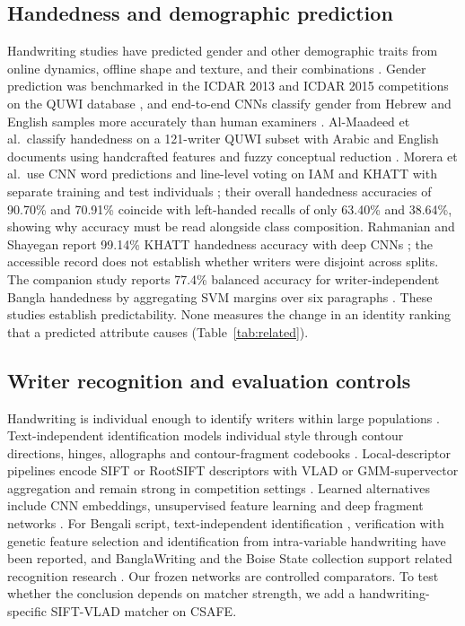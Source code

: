 \subsection{Handedness and demographic prediction}
Handwriting studies have predicted gender and other demographic traits from online dynamics, offline shape and texture, and their combinations \cite{liwicki2011gender,siddiqi2015gender,bouadjenek2016soft}. Gender prediction was benchmarked in the ICDAR 2013 and ICDAR 2015 competitions on the QUWI database \cite{hassaine2013icdar,djeddi2015icdar}, and end-to-end CNNs classify gender from Hebrew and English samples more accurately than human examiners \cite{illouz2018gender}. Al-Maadeed et al.\ classify handedness on a 121-writer QUWI subset with Arabic and English documents using handcrafted features and fuzzy conceptual reduction \cite{almaadeed2016handedness}. Morera et al.\ use CNN word predictions and line-level voting on IAM and KHATT with separate training and test individuals \cite{morera2018handedness}; their overall handedness accuracies of 90.70\% and 70.91\% coincide with left-handed recalls of only 63.40\% and 38.64\%, showing why accuracy must be read alongside class composition. Rahmanian and Shayegan report 99.14\% KHATT handedness accuracy with deep CNNs \cite{rahmanian2021handedness}; the accessible record does not establish whether writers were disjoint across splits. The companion study reports 77.4\% balanced accuracy for writer-independent Bangla handedness by aggregating SVM margins over six paragraphs \cite{prappo2026handedness}. These studies establish predictability. None measures the change in an identity ranking that a predicted attribute causes (Table~\ref{tab:related}).

\subsection{Writer recognition and evaluation controls}
Handwriting is individual enough to identify writers within large populations \cite{srihari2002individuality}. Text-independent identification models individual style through contour directions, hinges, allographs and contour-fragment codebooks \cite{bulacu2007text,schomaker2007codebooks}. Local-descriptor pipelines encode SIFT or RootSIFT descriptors \cite{lowe2004sift,arandjelovic2012rootsift} with VLAD or GMM-supervector aggregation \cite{jegou2010vlad,christlein2017gmm} and remain strong in competition settings \cite{louloudis2013icdar}. Learned alternatives include CNN embeddings, unsupervised feature learning and deep fragment networks \cite{fiel2015cnn,christlein2017unsupervised,he2020fragnet}. For Bengali script, text-independent identification \cite{chanda2010bengali}, verification with genetic feature selection \cite{paul2024bangla} and identification from intra-variable handwriting \cite{adak2019intravariable} have been reported, and BanglaWriting and the Boise State collection support related recognition research \cite{mridha2021banglawriting,majid2018bangla}. Our frozen networks are controlled comparators. To test whether the conclusion depends on matcher strength, we add a handwriting-specific SIFT-VLAD matcher on CSAFE.

